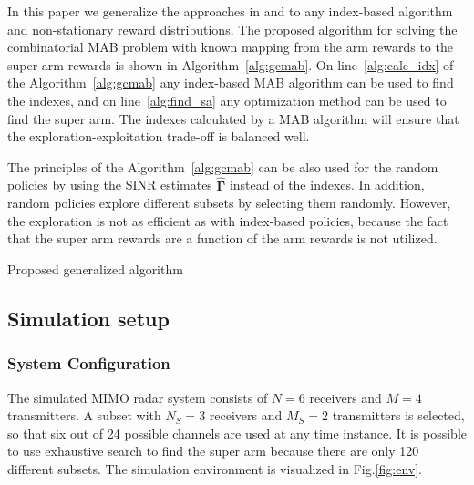 \documentclass[english, 12pt, a4paper, elec, utf8, a-1b, online]{aaltothesis}
\newcommand{\vsinrb}{\widehat{\boldsymbol{\Gamma}}}
\begin{document}
In this paper we generalize the approaches in \cite{Mukherjee2012} and \cite{Kuai2019} to any index-based algorithm and non-stationary reward distributions. 
The proposed algorithm for solving the combinatorial MAB problem with known mapping from the arm rewards to the super arm rewards is shown in Algorithm~\ref{alg:gcmab}.
On line~\ref{alg:calc_idx} of the Algorithm~\ref{alg:gcmab} any index-based MAB algorithm can be used to find the indexes, and on line~\ref{alg:find_sa} any optimization method can be used to find the super arm.
The indexes calculated by a MAB algorithm will ensure that the exploration-exploitation trade-off is balanced well.

The principles of the Algorithm~\ref{alg:gcmab} can be also used for the random policies by using the SINR estimates $\vsinrb$ instead of the indexes.
In addition, random policies explore different subsets by selecting them randomly.
However, the exploration is not as efficient as with index-based policies, because the fact that the super arm rewards are a function of the arm rewards is not utilized.

\begin{algorithm}[h]
\SetAlgoLined
{}
\caption{Proposed generalized algorithm}
\label{alg:gcmab}
\end{algorithm}

\subsection{Simulation setup}
\label{sec:sim}


\subsubsection{System Configuration}
\label{sec:sys_conf}
The simulated MIMO radar system consists of $N=6$ receivers and $M=4$ transmitters.
A subset with $N_S=3$ receivers and $M_S=2$ transmitters is selected, so that six out of 24 possible channels are used at any time instance.
It is possible to use exhaustive search to find the super arm because there are only 120 different subsets.
The simulation environment is visualized in Fig.\ref{fig:env}.
\end{document}
